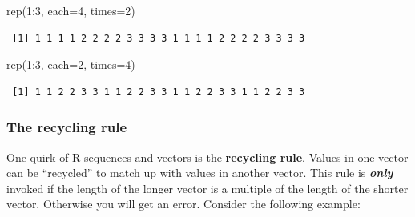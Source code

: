 \documentclass[
  13,
  letterpaper,
]{report}
\newenvironment{Shaded}{\begin{snugshade}}{\end{snugshade}}
\newcommand{\AttributeTok}[1]{\textcolor[rgb]{0.40,0.45,0.13}{#1}}
\newcommand{\CommentTok}[1]{\textcolor[rgb]{0.37,0.37,0.37}{#1}}
\newcommand{\DecValTok}[1]{\textcolor[rgb]{0.68,0.00,0.00}{#1}}
\newcommand{\FunctionTok}[1]{\textcolor[rgb]{0.28,0.35,0.67}{#1}}
\newcommand{\NormalTok}[1]{\textcolor[rgb]{0.00,0.23,0.31}{#1}}
\newcommand{\OtherTok}[1]{\textcolor[rgb]{0.00,0.23,0.31}{#1}}
\newcommand{\SpecialCharTok}[1]{\textcolor[rgb]{0.37,0.37,0.37}{#1}}
\begin{document}
\begin{Shaded}
\begin{Highlighting}[]
\FunctionTok{rep}\NormalTok{(}\DecValTok{1}\SpecialCharTok{:}\DecValTok{3}\NormalTok{, }\AttributeTok{each=}\DecValTok{4}\NormalTok{, }\AttributeTok{times=}\DecValTok{2}\NormalTok{)}
\end{Highlighting}
\end{Shaded}

\begin{verbatim}
 [1] 1 1 1 1 2 2 2 2 3 3 3 3 1 1 1 1 2 2 2 2 3 3 3 3
\end{verbatim}

\begin{Shaded}
\begin{Highlighting}[]
\FunctionTok{rep}\NormalTok{(}\DecValTok{1}\SpecialCharTok{:}\DecValTok{3}\NormalTok{, }\AttributeTok{each=}\DecValTok{2}\NormalTok{, }\AttributeTok{times=}\DecValTok{4}\NormalTok{)}
\end{Highlighting}
\end{Shaded}

\begin{verbatim}
 [1] 1 1 2 2 3 3 1 1 2 2 3 3 1 1 2 2 3 3 1 1 2 2 3 3
\end{verbatim}

\subsubsection{The recycling rule}\label{sec-05-make-seq-rec}

One quirk of R sequences and vectors is the \textbf{recycling rule}.
Values in one vector can be ``recycled'' to match up with values in
another vector. This rule is \textbf{\emph{only}} invoked if the length
of the longer vector is a multiple of the length of the shorter vector.
Otherwise you will get an error. Consider the following example:

\begin{Shaded}
\end{Shaded}
\end{document}
